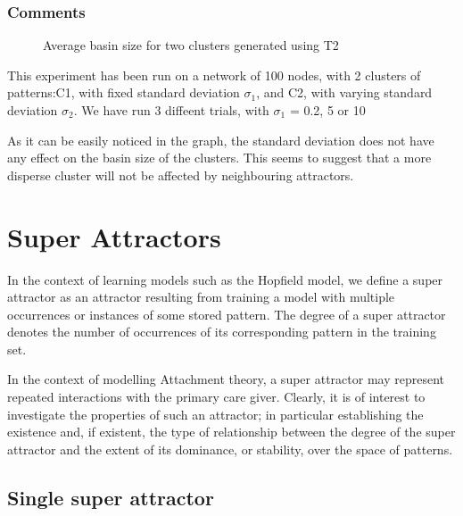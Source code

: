 \subsubsection{Comments}

\begin{figure}[h]
  \centering
  
\caption{Average basin size for two clusters generated using T2}
\label{fig:plot-T2-twocluster}
\end{figure}

This experiment has been run on a network of 100 nodes, with 2 clusters of patterns:C1, with fixed standard deviation $\sigma_{1}$, and C2, with varying standard deviation $\sigma_{2}$. We have run 3 diffeent trials, with $\sigma_{1}$ = 0.2, 5 or 10

As it can be easily noticed in the graph, the standard deviation does not have any effect on the basin size of the clusters. This seems to suggest that a more disperse cluster will not be affected by neighbouring attractors.


\section{Super Attractors}
\label{super_attractors}
In the context of learning models such as the Hopfield model, we define a super attractor as an attractor resulting from training a model with multiple occurrences or instances of some stored pattern. The degree of a super attractor denotes the number of occurrences of its corresponding pattern in the training set.


In the context of modelling Attachment theory, a super attractor may represent repeated interactions with the primary care giver. Clearly, it is of interest to investigate the properties of such an attractor; in particular establishing the existence and, if existent, the type of relationship between the degree of the super attractor and the extent of its dominance, or stability, over the space of patterns.


\subsection{Single super attractor}

\newcommand{\psuper}{$p_{super}$}
\newcommand{\prandom}{$\overrightarrow{p}_{random}$}

